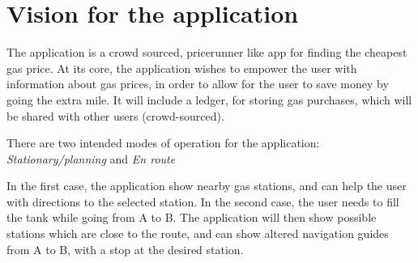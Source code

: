 
\chapter{Vision for the application}
The application is a crowd sourced, pricerunner like app for finding the cheapest gas price. At its core, the application wishes to empower the user with information about gas prices, in order to allow for the user to save money by going the extra mile. It will include a ledger, for storing gas purchases, which will be shared with other users (crowd-sourced).

There are two intended modes of operation for the application: \emph{Stationary/planning} and \emph{En route}

In the first case, the application show nearby gas stations, and can help the user with directions to the selected station. In the second case, the user needs to fill the tank while going from A to B. The application will then show possible stations which are close to the route, and can show altered navigation guides from A to B, with a stop at the desired station.